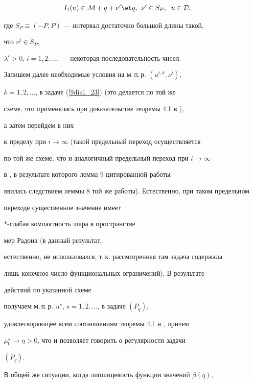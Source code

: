 \begin{pf}
\begin{gather}
%


I_1(u)\in{\cal M}+q+\nu'\wt q,\, \; \nu'\in S_P,\ \;


u\in{\cal D},\notag


\end{gather}


где $S_P\equiv (-P,P)$ --- интервал достаточно большой длины такой,


что $\nu^i\in S_P$,


$\lambda^i>0$, $i=1,2,\dotsc$, --- некоторая последовательность чисел.


Запишем далее необходимые условия на м.\,п.\,р. $(u^{i,k},\nu^i)$,


$k=1,2,\dotsc$, в задаче (\ref{9dis1_23}) (это делается по той же


схеме, что применялась при доказательстве теоремы 4.1 в \cite{sumin98}),


а затем перейдем в них


к пределу при $i\to\infty$ (такой предельный переход осуществляется


по той же схеме, что и аналогичный предельный переход при $i\to\infty$


в \cite{sumin97a}, в результате которого лемма 9 цитированной работы


явилась следствием леммы 8 той же работы). Естественно, при таком предельном


переходе существенное значение имеет


$*$-слабая компактность шара в пространстве


мер Радона (в \cite{sumin97a} данный результат,


естественно, не использовался, т.\,к. рассмотренная там задача содержала


лишь конечное число функциональных ограничений). В результате


действий по указанной схеме


получаем м.\,п.\,р. $u^s$, $s=1,2,\dotsc$, в задаче $(P_q)$,


удовлетворяющее всем соотношениям теоремы 4.1 в \cite{sumin98}, причем


$\mu_0^s\to\eta>0$, что и позволяет говорить о регулярности задачи


$(P_q)$.


\end{pf}





В общей же ситуации, когда липшицевость функции значений $\beta(q)$,


